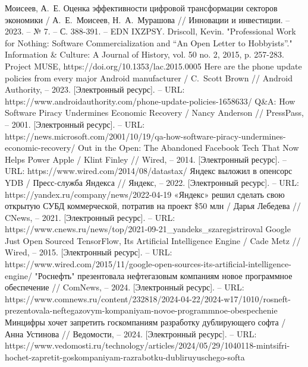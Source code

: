\documentclass{article}
\begin{document}
\begin{thebibliography}{2}
 Моисеев, А.~Е. Оценка эффективности цифровой трансформации секторов экономики / А.~Е.~Моисеев, Н.~А.~Мурашова // Инновации и инвестиции. – 2023. – № 7. – С. 388-391. – EDN IXZPSY.
 Driscoll, Kevin. "Professional Work for Nothing: Software Commercialization and “An Open Letter to Hobbyists”." Information \& Culture: A Journal of History, vol. 50 no. 2, 2015, p. 257-283. Project MUSE, https://doi.org/10.1353/lac.2015.0005
 Here are the phone update policies from every major Android manufacturer / C.~Scott Brown // Android Authority, – 2023. [Электронный ресурс]. – URL: https://www.androidauthority.com/phone-update-policies-1658633/
 Q\&A: How Software Piracy Undermines Economic Recovery / Nancy Anderson // PressPass, – 2001. [Электронный ресурс]. – URL: https://news.microsoft.com/2001/10/19/qa-how-software-piracy-undermines-economic-recovery/
 Out in the Open: The Abandoned Facebook Tech That Now Helps Power Apple / Klint Finley // Wired, – 2014. [Электронный ресурс]. – URL: https://www.wired.com/2014/08/datastax/
 Яндекс выложил в опенсорс YDB / Пресс-служба Яндекса // Яндекс, – 2022. [Электронный ресурс]. – URL: https://yandex.ru/company/news/2022-04-19
 «Яндекс» решил сделать свою открытую СУБД коммерческой, потратив на проект \$50 млн / Дарья Лебедева // CNews, – 2021. [Электронный ресурс]. – URL: https://www.cnews.ru/news/top/2021-09-21\_yandeks\_szaregistriroval
 Google Just Open Sourced TensorFlow, Its Artificial Intelligence Engine / Cade Metz // Wired, – 2015. [Электронный ресурс]. – URL: https://www.wired.com/2015/11/google-open-sources-its-artificial-intelligence-engine/
 "Роснефть" презентовала нефтегазовым компаниям новое программное обеспечение // ComNews, – 2024. [Электронный ресурс]. – URL: https://www.comnews.ru/content/232818/2024-04-22/2024-w17/1010/rosneft-prezentovala-neftegazovym-kompaniyam-novoe-programmnoe-obespechenie
 Минцифры хочет запретить госкомпаниям разработку дублирующего софта / Анна Устинова // Ведомости, – 2024. [Электронный ресурс]. – URL: https://www.vedomosti.ru/technology/articles/2024/05/29/1040118-mintsifri-hochet-zapretit-goskompaniyam-razrabotku-dubliruyuschego-softa

\end{thebibliography}
\end{document}
